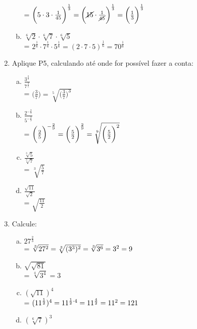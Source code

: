 \documentclass[a4paper,14pt]{article}
\begin{document}
\begin{multicols}{2}
\begin{enumerate}
\begin{enumerate}[a)]
        	= $\bigg(5 \cdot 3 \cdot \frac{1}{45} \bigg)^\frac{1}{3}
        	= \bigg(\cancel{15} \cdot \frac{1}{\cancel{45}} \bigg)^\frac{1}{3} \\\\
        	= \bigg(\frac{1}{3}\bigg)^\frac{1}{3}$
        	\item $\sqrt[6]{2} \cdot \sqrt[6]{7} \cdot \sqrt[6]{5}$\\
        	= $2^\frac{1}{6} \cdot 7^\frac{1}{6} \cdot 5^\frac{1}{6}
        	= (2 \cdot 7 \cdot 5)^\frac{1}{6}
        	= 70^\frac{1}{6}$
        \end{enumerate}
        \item Aplique P5, calculando até onde for possível fazer a conta:
        \begin{enumerate}[a)]
        	\item $\frac{3^\frac{3}{5}}{7^\frac{3}{5}}$\\
        	= $\bigg(\frac{3}{7}\bigg) = \sqrt[5]{\bigg(\frac{3}{7}\bigg)^3}$
        	\item $\frac{2^{-\frac{2}{9}}}{5^{-\frac{2}{9}}}$\\
        	= $\bigg(\frac{2}{5}\bigg)^{-\frac{2}{9}} \\
        	= \bigg(\frac{5}{2}\bigg)^\frac{2}{9}
        	= \sqrt[9]{\bigg(\frac{5}{2}\bigg)^2}$
        	\item $\frac{\sqrt[3]{5}}{\sqrt[3]{7}}$\\
        	= $\sqrt[3]{\frac{5}{7}}$
        	\item $\frac{\sqrt{11}}{\sqrt{2}}$\\
        	= $\sqrt{\frac{11}{2}}$
        \end{enumerate}
        \item Calcule:
        \begin{enumerate}[a)]
        	\item $27^\frac{2}{3}$\\
        	= $\sqrt[3]{27^2}
        	= \sqrt[3]{(3^3)^2}
        	= \sqrt[3]{3^6} \\
        	= 3^2
        	= 9$
        	\item $\sqrt{\sqrt{81}}$\\
        	= $\sqrt[4]{3^4}
        	= 3$
        	\item $(\sqrt{11})^4$\\
        	= $(11^\frac{1}{2})^4
        	= 11^{\frac{1}{2} \cdot 4}
        	= 11^\frac{4}{2} \\
        	= 11^2
        	= 121$
        	\item $(\sqrt[6]{7})^3$\\

\end{enumerate}
\end{enumerate}
\end{multicols}
\end{document}
